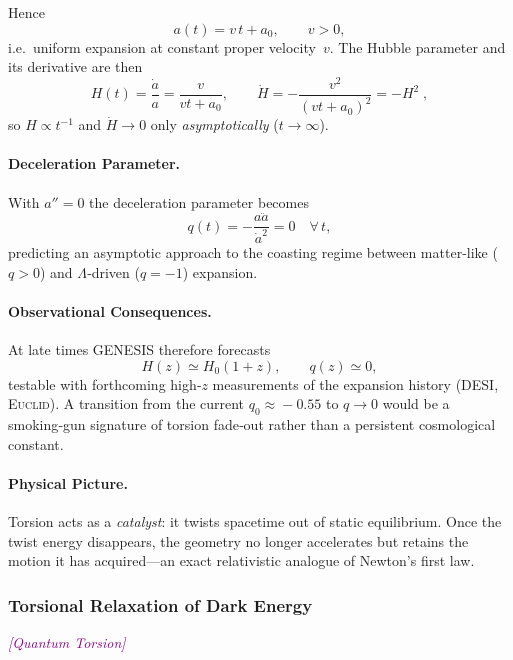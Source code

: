 \documentclass{article}
\newcommand{\quantumtag}{\textcolor{purple}{\textit{[Quantum Torsion]}}}
\begin{document}
Hence
\begin{equation}\label{eq:auto111}
a(t)=v\,t+a_{0},\qquad v>0,
\end{equation}
i.e.\ uniform expansion at constant proper velocity~$v$.  
The Hubble parameter and its derivative are then
\begin{equation}\label{eq:auto112}
H(t)=\frac{\dot a}{a}=\frac{v}{v t+a_{0}},\qquad
\dot H=-\frac{v^{2}}{(v t+a_{0})^{2}}=-H^{2}\;,
\end{equation}
so $H\propto t^{-1}$ and $\dot H\to0$ only \emph{asymptotically} ($t\!\to\!\infty$).

\paragraph{Deceleration Parameter.}
With $a''=0$ the deceleration parameter becomes
\begin{equation}\label{eq:auto113}
q(t)=-\frac{a\ddot a}{\dot a^{2}}=0 \quad\forall\,t,
\end{equation}
predicting an asymptotic approach to the coasting regime between matter‑like ($q>0$) and
$\Lambda$‑driven ($q=-1$) expansion.

\paragraph{Observational Consequences.}
At late times GENESIS therefore forecasts
\begin{equation}\label{eq:auto114}
H(z)\simeq H_{0}(1+z),\qquad q(z)\simeq 0 ,
\end{equation}
testable with forthcoming high‑$z$ measurements of the expansion history
(\textsc{DESI}, \textsc{Euclid}).  
A transition from the current $q_{0}\!\approx\!-0.55$ to $q\!\rightarrow\!0$ would be a smoking‑gun
signature of torsion fade‑out rather than a persistent cosmological constant.

\paragraph{Physical Picture.}
Torsion acts as a \emph{catalyst}: it twists spacetime out of static equilibrium.
Once the twist energy disappears, the geometry no longer accelerates but retains the
motion it has acquired—an exact relativistic analogue of Newton’s first law.


\subsubsection{ Torsional Relaxation of Dark Energy}
\quantumtag
\end{document}
